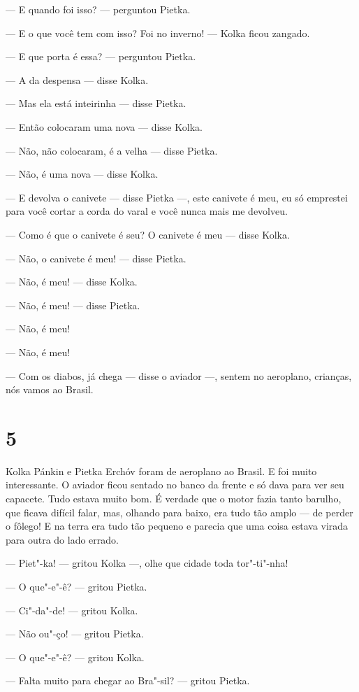 --- E quando foi isso? --- perguntou Pietka.

--- E o que você tem com isso? Foi no inverno! --- Kolka ficou zangado.

--- E que porta é essa? --- perguntou Pietka.

--- A da despensa --- disse Kolka.

--- Mas ela está inteirinha --- disse Pietka.

--- Então colocaram uma nova --- disse Kolka.

--- Não, não colocaram, é a velha --- disse Pietka.

--- Não, é uma nova --- disse Kolka.

--- E devolva o canivete --- disse Pietka ---, este canivete é meu,
eu só emprestei para você cortar a corda do varal e você nunca mais me
devolveu.

--- Como é que o canivete é seu? O canivete é meu --- disse Kolka.

--- Não, o canivete é meu! --- disse Pietka.

--- Não, é meu! --- disse Kolka.

--- Não, é meu! --- disse Pietka.

--- Não, é meu!

--- Não, é meu!

--- Com os diabos, já chega --- disse o aviador ---, sentem no
aeroplano, crianças, nós vamos ao Brasil.

\section{5}

Kolka Pánkin e Pietka Erchóv foram de aeroplano ao Brasil. E foi muito
interessante. O aviador ficou sentado no banco da frente e só dava para
ver seu capacete. Tudo estava muito bom. É verdade que o motor fazia
tanto barulho, que ficava difícil falar, mas, olhando para baixo, era
tudo tão amplo --- de perder o fôlego! E na terra era tudo tão pequeno e
parecia que uma coisa estava virada para outra do lado errado.

--- Piet"-ka! --- gritou Kolka ---, olhe que cidade toda tor"-ti"-nha!

--- O que"-e"-ê? --- gritou Pietka.

--- Ci"-da"-de! --- gritou Kolka.

--- Não ou"-ço! --- gritou Pietka.

--- O que"-e"-ê? --- gritou Kolka.

--- Falta muito para chegar ao Bra"-sil? --- gritou Pietka.


